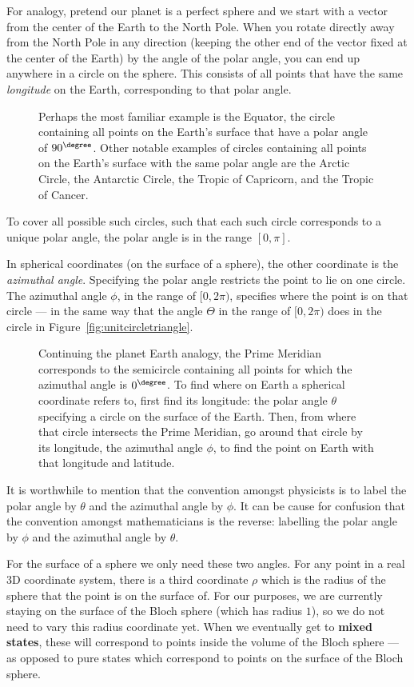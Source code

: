 \documentclass{article}
\def\tikzscale{1.5}
\theoremstyle{definition}
\begin{document}
For analogy, pretend our planet is a perfect sphere and we start with a vector from the center of the Earth to the North Pole.  When you rotate directly away from the North Pole in any direction (keeping the other end of the vector fixed at the center of the Earth) by the angle of the polar angle, you can end up anywhere in a circle on the sphere.  This consists of all points that have the same \textit{longitude} on the Earth, corresponding to that polar angle.
\begin{figure}[H]
	\caption{Perhaps the most familiar example is the Equator, the circle containing all points on the Earth's surface that have a polar angle of $90^{\degree}$.
	Other notable examples of circles containing all points on the Earth's surface with the same polar angle are the Arctic Circle, the Antarctic Circle, the Tropic of Capricorn, and the Tropic of Cancer.}
\end{figure}
To cover all possible such circles, such that each such circle corresponds to a unique polar angle, the polar angle is in the range $[0,\pi]$.

In spherical coordinates (on the surface of a sphere), the other coordinate is the \textit{azimuthal angle}.  Specifying the polar angle restricts the point to lie on one circle.  The azimuthal angle $\phi$, in the range of $[0,2\pi)$, specifies where the point is on that circle --- in the same way that the angle $\Theta$ in the range of $[0,2\pi)$ does in the circle in Figure~\ref{fig:unitcircletriangle}.
\begin{figure}[H]
	\centering
	\scalebox{\tikzscale}{\tikzfig{latitude}}
	\caption{Continuing the planet Earth analogy, the Prime Meridian corresponds to the semicircle containing all points for which the azimuthal angle is $0^{\degree}$.  To find where on Earth a spherical coordinate refers to, first find its longitude: the polar angle $\theta$ specifying a circle on the surface of the Earth.  Then, from where that circle intersects the Prime Meridian, go around that circle by its longitude, the azimuthal angle $\phi$, to find the point on Earth with that longitude and latitude.}
\end{figure}
It is worthwhile to mention that the convention amongst physicists is to label the polar angle by $\theta$ and the azimuthal angle by $\phi$.  It can be cause for confusion that the convention amongst mathematicians is the reverse: labelling the polar angle by $\phi$ and the azimuthal angle by $\theta$.

For the surface of a sphere we only need these two angles.  For any point in a real 3D coordinate system, there is a third coordinate $\rho$ which is the radius of the sphere that the point is on the surface of.  For our purposes, we are currently staying on the surface of the Bloch sphere (which has radius $1$), so we do not need to vary this radius coordinate yet.  When we eventually get to \textbf{mixed states}, these will correspond to points inside the volume of the Bloch sphere --- as opposed to pure states which correspond to points on the surface of the Bloch sphere.
\end{document}
